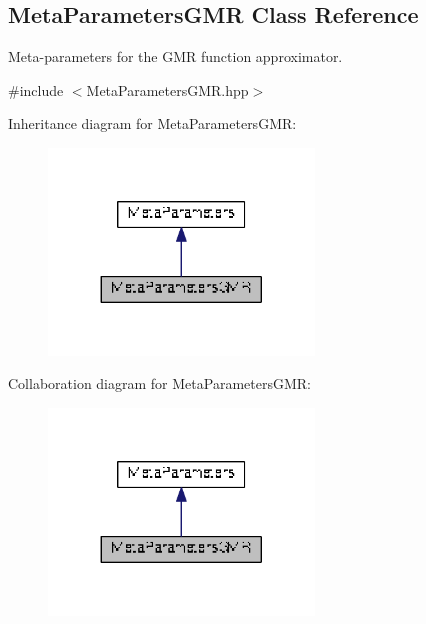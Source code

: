 \hypertarget{classDmpBbo_1_1MetaParametersGMR}{\subsection{Meta\+Parameters\+G\+M\+R Class Reference}
\label{classDmpBbo_1_1MetaParametersGMR}
}


Meta-\/parameters for the G\+M\+R function approximator.  




{\ttfamily \#include $<$Meta\+Parameters\+G\+M\+R.\+hpp$>$}



Inheritance diagram for Meta\+Parameters\+G\+M\+R\+:
\nopagebreak
\begin{figure}[H]
\begin{center}
\leavevmode
\includegraphics[width=200pt]{classDmpBbo_1_1MetaParametersGMR__inherit__graph}
\end{center}
\end{figure}


Collaboration diagram for Meta\+Parameters\+G\+M\+R\+:
\nopagebreak
\begin{figure}[H]
\begin{center}
\leavevmode
\includegraphics[width=200pt]{classDmpBbo_1_1MetaParametersGMR__coll__graph}
\end{center}
\end{figure}
